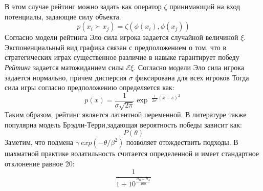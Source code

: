 В этом случае рейтинг можно задать как оператор $\zeta$ принимающий на вход потенциалы, задающие силу объекта.
\begin{equation}
    p(x_i \succ x_j) = \zeta(\phi(x_i),\phi(x_j))
\end{equation}
Согласно модели рейтинга Эло сила игрока задается случайной величиной $\xi$. 
Экспоненциальный вид графика связан с предположением о том, что в стратегических играх существенное различие в навыке гарантирует победу
\textit{Рейтинг} задается матожиданием силы $\mathcal{E} \xi$.
Согласно модели Эло сила игрока задается нормально, причем дисперсия $\sigma$ фиксирована для всех игроков
Тогда сила игры согласно предположению определяется как:
\begin{equation}
    p(x) = \frac{1}{\sigma \sqrt{2\pi}} \exp^{- \frac{1}{2\sigma^2}{(x-s)^2}}
\end{equation}
Таким образом, рейтинг является латентной переменной. В литературе также популярна модель Брэдли-Терри,задающая
вероятность победы зависит как:
\begin{equation}
    P(\theta)
\end{equation}
Заметим, что подмена $\gamma ~ exp(-\theta/\beta^2)$ позволяет отождествить подходы.
В шахматной практике волатильность считается определенной и имеет стандартное отклонение равное 20:
\begin{equation}
    \frac{1}{1+10^\frac{R_B-R_A}{400}} 
\end{equation}













